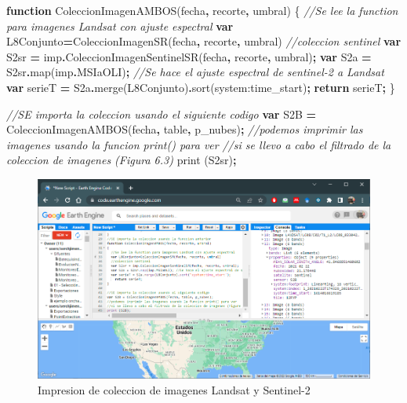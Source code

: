 \documentclass[
]{book}
\newenvironment{Shaded}{\begin{snugshade}}{\end{snugshade}}
\newcommand{\AttributeTok}[1]{\textcolor[rgb]{0.77,0.63,0.00}{#1}}
\newcommand{\CommentTok}[1]{\textcolor[rgb]{0.56,0.35,0.01}{\textit{#1}}}
\newcommand{\ControlFlowTok}[1]{\textcolor[rgb]{0.13,0.29,0.53}{\textbf{#1}}}
\newcommand{\FunctionTok}[1]{\textcolor[rgb]{0.00,0.00,0.00}{#1}}
\newcommand{\KeywordTok}[1]{\textcolor[rgb]{0.13,0.29,0.53}{\textbf{#1}}}
\newcommand{\NormalTok}[1]{#1}
\newcommand{\OperatorTok}[1]{\textcolor[rgb]{0.81,0.36,0.00}{\textbf{#1}}}
\newcommand{\StringTok}[1]{\textcolor[rgb]{0.31,0.60,0.02}{#1}}
\begin{document}
\begin{Shaded}
\begin{Highlighting}[]
\KeywordTok{function} \FunctionTok{ColeccionImagenAMBOS}\NormalTok{(fecha}\OperatorTok{,}\NormalTok{ recorte}\OperatorTok{,}\NormalTok{ umbral)}
\NormalTok{\{}
  \CommentTok{//Se lee la function para imagenes Landsat con ajuste espectral}
  \KeywordTok{var}\NormalTok{ L8Conjunto}\OperatorTok{=}\FunctionTok{ColeccionImagenSR}\NormalTok{(fecha}\OperatorTok{,}\NormalTok{ recorte}\OperatorTok{,}\NormalTok{ umbral)}
  \CommentTok{//coleccion sentinel}
  \KeywordTok{var}\NormalTok{ S2sr }\OperatorTok{=}\NormalTok{ imp}\OperatorTok{.}\FunctionTok{ColeccionImagenSentinelSR}\NormalTok{(fecha}\OperatorTok{,}\NormalTok{ recorte}\OperatorTok{,}\NormalTok{ umbral)}\OperatorTok{;}
  \KeywordTok{var}\NormalTok{ S2a }\OperatorTok{=}\NormalTok{ S2sr}\OperatorTok{.}\FunctionTok{map}\NormalTok{(imp}\OperatorTok{.}\AttributeTok{MSIaOLI}\NormalTok{)}\OperatorTok{;} \CommentTok{//Se hace el ajuste espectral de sentinel{-}2 a Landsat}
  \KeywordTok{var}\NormalTok{ serieT }\OperatorTok{=}\NormalTok{ S2a}\OperatorTok{.}\FunctionTok{merge}\NormalTok{(L8Conjunto)}\OperatorTok{.}\FunctionTok{sort}\NormalTok{(}\StringTok{\textquotesingle{}system:time\_start\textquotesingle{}}\NormalTok{)}\OperatorTok{;}
    \ControlFlowTok{return}\NormalTok{ serieT}\OperatorTok{;}
\NormalTok{\}}

\CommentTok{//SE importa la coleccion usando el siguiente codigo}
\KeywordTok{var}\NormalTok{ S2B }\OperatorTok{=} \FunctionTok{ColeccionImagenAMBOS}\NormalTok{(fecha}\OperatorTok{,}\NormalTok{ table}\OperatorTok{,}\NormalTok{ p\_nubes)}\OperatorTok{;}
\CommentTok{//podemos imprimir las imagenes usando la funcion print() para ver }
\CommentTok{//si se llevo a cabo el filtrado de la coleccion de imagenes (Figura 6.3)}
\FunctionTok{print}\NormalTok{ (S2sr)}\OperatorTok{;}
\end{Highlighting}
\end{Shaded}

\begin{figure}

{\centering \includegraphics[width=0.85\linewidth]{./images/Figure72} 

}

\caption{Impresion de coleccion de imagenes Landsat y Sentinel-2}\label{fig:figV3}
\end{figure}
\end{document}
